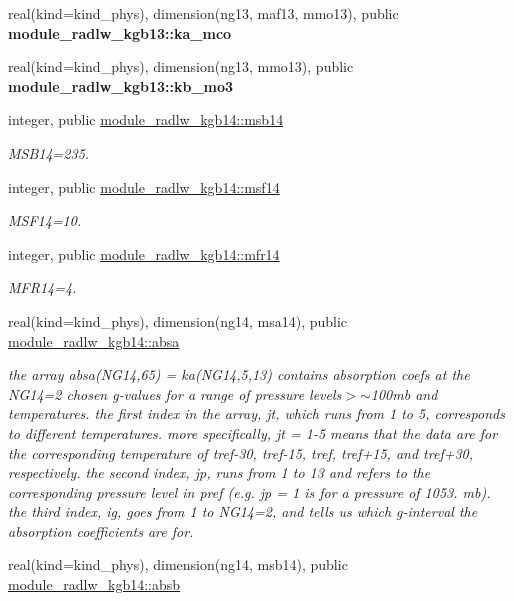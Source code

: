 \begin{Indent}
\begin{DoxyCompactItemize}
real(kind=kind\+\_\+phys), dimension(ng13, maf13, mmo13), public {\bfseries module\+\_\+radlw\+\_\+kgb13\+::ka\+\_\+mco}
\item 
real(kind=kind\+\_\+phys), dimension(ng13, mmo13), public {\bfseries module\+\_\+radlw\+\_\+kgb13\+::kb\+\_\+mo3}
\item 
integer, public \hyperlink{group__module__radlw__kgbnn_ga2d400a2aa969f2b2b6efd15555b67159}{module\+\_\+radlw\+\_\+kgb14\+::msb14}
\begin{DoxyCompactList}\small\item\em M\+S\+B14=235. \end{DoxyCompactList}\item 
integer, public \hyperlink{group__module__radlw__kgbnn_ga37c15d52e45cd6b36dc246a059b0c5ca}{module\+\_\+radlw\+\_\+kgb14\+::msf14}
\begin{DoxyCompactList}\small\item\em M\+S\+F14=10. \end{DoxyCompactList}\item 
integer, public \hyperlink{group__module__radlw__kgbnn_ga52354badbce95c005b19bd5a443fd488}{module\+\_\+radlw\+\_\+kgb14\+::mfr14}
\begin{DoxyCompactList}\small\item\em M\+F\+R14=4. \end{DoxyCompactList}\item 
real(kind=kind\+\_\+phys), dimension(ng14, msa14), public \hyperlink{group__module__radlw__kgbnn_gab57cb029ede27280bc99641f39ab3a81}{module\+\_\+radlw\+\_\+kgb14\+::absa}
\begin{DoxyCompactList}\small\item\em the array absa(\+N\+G14,65) = ka(\+N\+G14,5,13) contains absorption coefs at the N\+G14=2 chosen g-\/values for a range of pressure levels$>$$\sim$100mb and temperatures. the first index in the array, jt, which runs from 1 to 5, corresponds to different temperatures. more specifically, jt = 1-\/5 means that the data are for the corresponding temperature of tref-\/30, tref-\/15, tref, tref+15, and tref+30, respectively. the second index, jp, runs from 1 to 13 and refers to the corresponding pressure level in pref (e.\+g. jp = 1 is for a pressure of 1053. mb). the third index, ig, goes from 1 to N\+G14=2, and tells us which g-\/interval the absorption coefficients are for. \end{DoxyCompactList}\item 
real(kind=kind\+\_\+phys), dimension(ng14, msb14), public \hyperlink{group__module__radlw__kgbnn_gaa7a122319c49f3c1e8d51d21771cb63d}{module\+\_\+radlw\+\_\+kgb14\+::absb}

\end{DoxyCompactItemize}
\end{Indent}
